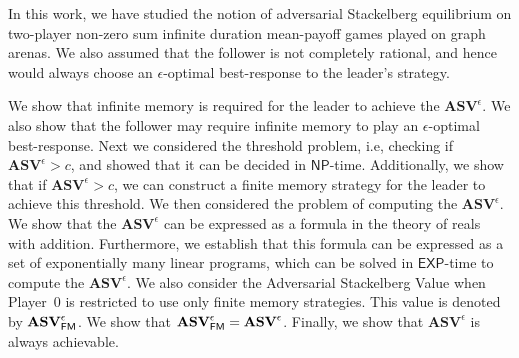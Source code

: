 In this work, we have studied the notion of adversarial Stackelberg equilibrium on two-player non-zero sum infinite duration mean-payoff games played on graph arenas. We also assumed that the follower is not completely rational, and hence would always choose an $\epsilon$-optimal best-response to the leader's strategy.

We show that infinite memory is required for the leader to achieve the $\mathbf{ASV}^{\epsilon}$. We also show that the follower may require infinite memory to play an $\epsilon$-optimal best-response. 
Next we considered the threshold problem, i.e, checking if $\mathbf{ASV}^{\epsilon} > c$, and showed that it can be decided in $\mathsf{NP}$-time. Additionally, we show that if $\mathbf{ASV}^{\epsilon} > c$, we can construct a finite memory strategy for the leader to achieve this threshold. 
We then considered the problem of computing the $\mathbf{ASV}^{\epsilon}$.
We show that the $\mathbf{ASV}^{\epsilon}$ can be expressed as a formula in the theory of reals with addition. Furthermore, we establish that this formula can be expressed as a set of exponentially many linear programs, which can be solved in $\mathsf{EXP}$-time to compute the $\mathbf{ASV}^{\epsilon}$.
We also consider the Adversarial Stackelberg Value when Player~$0$ is restricted to use only finite memory strategies.
This value is denoted by $\mathbf{ASV}^{\epsilon}_{\sf FM}$.
We show that $\mathbf{ASV}^{\epsilon}_{\sf FM} = \mathbf{ASV}^{\epsilon}$.
Finally, we show that $\mathbf{ASV}^{\epsilon}$ is always achievable.

